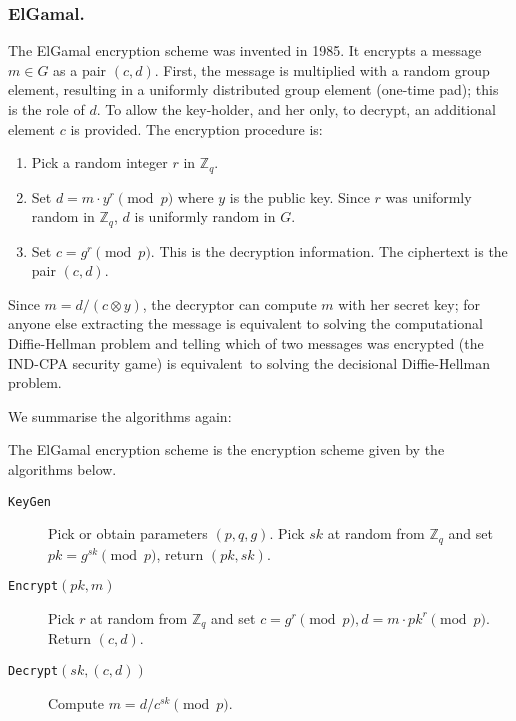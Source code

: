 \documentclass{llncs}
\newcommand{\alg}[1]{\textup{\texttt{#1}}}
\begin{document}
\subsubsection{ElGamal.}
The ElGamal encryption scheme \cite{E85} was invented in 1985.
It encrypts a message $m \in G$ as a pair $(c, d)$.
First, the message is multiplied with a random group element, resulting in a
uniformly distributed group element (one-time pad); this is the role of $d$.
To allow the key-holder, and her only, to decrypt, an additional element $c$ is provided. The encryption procedure is:
\begin{enumerate}
\item Pick a random integer $r$ in $\mathbb Z_q$.
\item Set $d = m \cdot y^r \pmod{p}$ where $y$ is the public key. Since $r$ was
uniformly random in $\mathbb Z_q$, $d$ is uniformly random in $G$.
\item Set $c = g^r \pmod{p}$. This is the decryption information.
The ciphertext is the pair $(c, d)$.
\end{enumerate}
Since $m = d/(c \otimes y)$, the decryptor can compute $m$ with her secret key;
for anyone else extracting the message is equivalent to solving the
computational Diffie-Hellman problem and telling which of two messages was
encrypted (the IND-CPA security game) is equivalent\footnotemark\ to solving the
decisional Diffie-Hellman problem.

We summarise the algorithms again:
\begin{definition}
The ElGamal encryption scheme is the encryption scheme given by the algorithms below.
\end{definition}
\begin{description}

\item[\alg{KeyGen}] Pick or obtain parameters $(p, q, g)$. Pick $sk$ at random
from $\mathbb Z_q$ and set $pk = g^{sk} \pmod{p}$, return $(pk, sk)$.

\item[\alg{Encrypt}$(pk, m)$] Pick $r$ at random from $\mathbb Z_q$ and set
$c = g^r \pmod{p}, d = m \cdot pk^r \pmod{p}$. Return $(c, d)$.

\item[\alg{Decrypt}$(sk, (c, d))$] Compute $m = d / c^{sk} \pmod{p}$.
\end{description}
\end{document}

